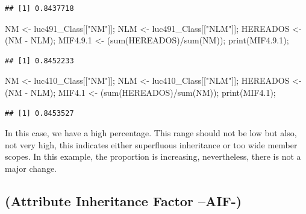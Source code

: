 \documentclass[
]{article}
\newenvironment{Shaded}{\begin{snugshade}}{\end{snugshade}}
\newcommand{\FloatTok}[1]{\textcolor[rgb]{0.00,0.00,0.81}{#1}}
\newcommand{\FunctionTok}[1]{\textcolor[rgb]{0.00,0.00,0.00}{#1}}
\newcommand{\NormalTok}[1]{#1}
\newcommand{\OtherTok}[1]{\textcolor[rgb]{0.56,0.35,0.01}{#1}}
\newcommand{\SpecialCharTok}[1]{\textcolor[rgb]{0.00,0.00,0.00}{#1}}
\newcommand{\StringTok}[1]{\textcolor[rgb]{0.31,0.60,0.02}{#1}}
\begin{document}
\begin{verbatim}
## [1] 0.8437718
\end{verbatim}

\begin{Shaded}
\begin{Highlighting}[]
\NormalTok{NM }\OtherTok{\textless{}{-}}\NormalTok{ luc491\_Class[[}\StringTok{"NM"}\NormalTok{]];}
\NormalTok{NLM }\OtherTok{\textless{}{-}}\NormalTok{ luc491\_Class[[}\StringTok{"NLM"}\NormalTok{]];}
\NormalTok{HEREADOS }\OtherTok{\textless{}{-}}\NormalTok{ (NM }\SpecialCharTok{{-}}\NormalTok{ NLM);}
\NormalTok{MIF4.}\FloatTok{9.1} \OtherTok{\textless{}{-}}\NormalTok{ (}\FunctionTok{sum}\NormalTok{(HEREADOS)}\SpecialCharTok{/}\FunctionTok{sum}\NormalTok{(NM));}
\FunctionTok{print}\NormalTok{(MIF4.}\FloatTok{9.1}\NormalTok{);}
\end{Highlighting}
\end{Shaded}

\begin{verbatim}
## [1] 0.8452233
\end{verbatim}

\begin{Shaded}
\begin{Highlighting}[]
\NormalTok{NM }\OtherTok{\textless{}{-}}\NormalTok{ luc410\_Class[[}\StringTok{"NM"}\NormalTok{]];}
\NormalTok{NLM }\OtherTok{\textless{}{-}}\NormalTok{ luc410\_Class[[}\StringTok{"NLM"}\NormalTok{]];}
\NormalTok{HEREADOS }\OtherTok{\textless{}{-}}\NormalTok{ (NM }\SpecialCharTok{{-}}\NormalTok{ NLM);}
\NormalTok{MIF4}\FloatTok{.1} \OtherTok{\textless{}{-}}\NormalTok{ (}\FunctionTok{sum}\NormalTok{(HEREADOS)}\SpecialCharTok{/}\FunctionTok{sum}\NormalTok{(NM));}
\FunctionTok{print}\NormalTok{(MIF4}\FloatTok{.1}\NormalTok{);}
\end{Highlighting}
\end{Shaded}

\begin{verbatim}
## [1] 0.8453527
\end{verbatim}

In this case, we have a high percentage. This range should not be low
but also, not very high, this indicates either superfluous inheritance
or too wide member scopes. In this example, the proportion is
increasing, nevertheless, there is not a major change.

\hypertarget{attribute-inheritance-factor-aif-}{%
\subsection{(Attribute Inheritance Factor
--AIF-)}\label{attribute-inheritance-factor-aif-}}
\end{document}
